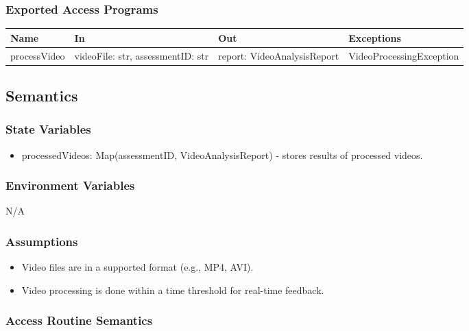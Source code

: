 \documentclass[12pt, titlepage]{article}
\begin{document}
\subsubsection{Exported Access Programs}
\begin{center}
  \begin{tabular}{p{3cm} p{4cm} p{4cm} p{5cm}}
  \hline
  \textbf{Name} & \textbf{In} & \textbf{Out} & \textbf{Exceptions} \\
  \hline
  processVideo & \raggedright\arraybackslash videoFile: str, assessmentID: str & \raggedright\arraybackslash report: VideoAnalysisReport & \raggedright\arraybackslash VideoProcessingException \\
  \end{tabular}
\end{center}

\subsection{Semantics}

\subsubsection{State Variables}
\begin{itemize}
\item processedVideos: Map(assessmentID, VideoAnalysisReport) - stores results of processed videos.
\end{itemize}

\subsubsection{Environment Variables}
N/A

\subsubsection{Assumptions}
\begin{itemize}
\item Video files are in a supported format (e.g., MP4, AVI).
\item Video processing is done within a time threshold for real-time feedback.
\end{itemize}

\subsubsection{Access Routine Semantics}
\end{document}
